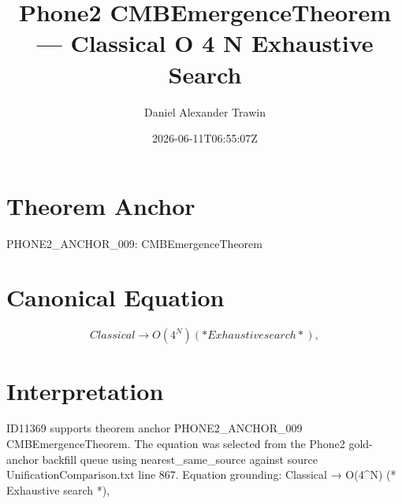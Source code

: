 \documentclass[11pt]{article}
\title{Phone2 CMBEmergenceTheorem — Classical O 4 N Exhaustive Search}
\author{Daniel Alexander Trawin}
\date{2026-06-11T06:55:07Z}
\begin{document}
\maketitle
\section*{Theorem Anchor}
PHONE2_ANCHOR_009: CMBEmergenceTheorem
\section*{Canonical Equation}
\[
Classical → O(4^N) (* Exhaustive search *),
\]
\section*{Interpretation}
ID11369 supports theorem anchor PHONE2_ANCHOR_009 CMBEmergenceTheorem. The equation was selected from the Phone2 gold-anchor backfill queue using nearest_same_source against source UnificationComparison.txt line 867. Equation grounding: Classical → O(4^N) (* Exhaustive search *),
\end{document}

